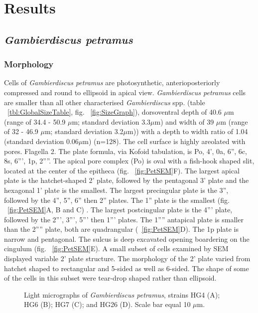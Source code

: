 \documentclass[12pt]{article}
\begin{document}
\section{Results}

\subsection{\emph{Gambierdiscus petramus}}
\subsubsection{Morphology}
Cells of \emph{Gambierdiscus petramus} are photosynthetic, anterioposteriorly compressed and round to ellipsoid in apical view. \emph{Gambierdiscus petramus} cells are smaller than all other characterised \emph{Gambierdiscus} spp. (table ~\ref{tbl:GlobalSizeTable}, fig. ~\ref{fig:SizeGraph}), dorsoventral depth of 40.6 $\mu$m (range of 34.4 - 50.9 $\mu$m; standard deviation 3.3$\mu$m) and width of 39 $\mu$m (range of 32 - 46.9 $\mu$m; standard deviation 3.2$\mu$m)) with a depth to width ratio of 1.04 (standard deviation 0.06$\mu$m)  (n=128). The cell surface is highly areolated with pores. Flagella 2. The plate formula, via Kofoid tabulation, is Po, 4', 0a, 6'', 6c, 8s, 6''', 1p, 2''''. 
The apical pore complex (Po) is oval with a fish-hook shaped slit, located at the center of the epitheca (fig. ~\ref{fig:PetSEM}F). The largest apical plate is the hatchet-shaped 2' plate, followed by the pentagonal 3' plate and the hexagonal 1' plate is the smallest. The largest precingular plate is the 3'', followed by the 4'', 5'', 6'' then 2'' plates. The 1'' plate is the smallest (fig. ~\ref{fig:PetSEM}A, B and C) . The largest postcingular plate is the 4''' plate, followed by the 2''', 3''', 5''' then 1''' plates. The 1'''' antapical plate is smaller than the 2'''' plate, both are quadrangular (~\ref{fig:PetSEM}D). The 1p plate is narrow and pentagonal. The sulcus is deep excavated opening boardering on the cingulum (fig. ~\ref{fig:PetSEM}E).
A small subset of cells examined by SEM displayed variable 2' plate structure. The morphology of the 2' plate varied from hatchet shaped to rectangular and 5-sided as well as 6-sided. The shape of some of the cells in this subset were tear-drop shaped rather than ellipsoid. 



\FloatBarrier 
\begin{figure} 
\caption{Light micrographs of \emph{Gambierdiscus petramus}, strains HG4 (A); HG6 (B); HG7 (C); and HG26 (D). Scale bar equal 10 $\mu$m.​} 
\label{fig:PetLM}
\end{figure} 
\end{document}
